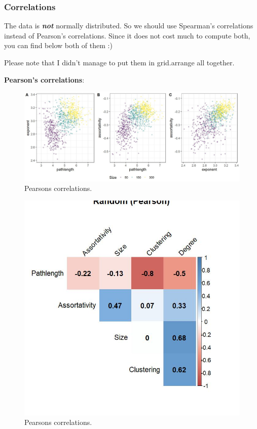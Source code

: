 \documentclass[
]{article}
\begin{document}
\hypertarget{correlations}{%
\subsubsection{Correlations}\label{correlations}}

The data is \textbf{\emph{not}} normally distributed. So we should use
Spearman's correlations instead of Pearson's correlations. Since it does
not cost much to compute both, you can find below both of them :)

Please note that I didn't manage to put them in grid.arrange all
together.

\textbf{Pearson's correlations}:

\begin{figure}[!H]

{\centering \includegraphics{./Figures/unnamed-chunk-78-1} 

}

\caption{Pearsons correlations.}\label{fig:unnamed-chunk-78-1}
\end{figure}
\begin{figure}[!H]

{\centering \includegraphics{./Figures/unnamed-chunk-78-2} 

}

\caption{Pearsons correlations.}\label{fig:unnamed-chunk-78-2}
\end{figure}
\end{document}
